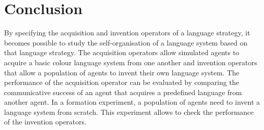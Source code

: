\section{Conclusion}

By specifying the acquisition and invention operators of a language
strategy, it becomes possible to study the self-organisation of a language
system based on that language strategy. The acquisition operators
allow simulated agents to acquire a basic colour language system from
one another and invention operators that allow a population of agents
to invent their own language system. The performance of the
acquisition operator can be evaluated by comparing the communicative
success of an agent that acquires a predefined language from another
agent. In a formation experiment, a population of agents need to
invent a language system from scratch. This experiment allows to check
the performance of the invention operators.

\newpage
\thispagestyle{empty}
